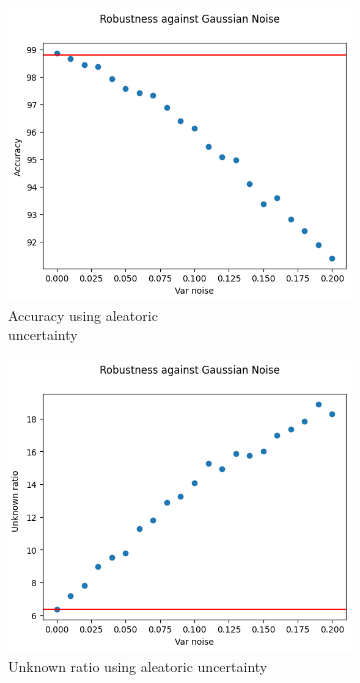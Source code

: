 \begin{figure}[h]
	\centering
	\begin{subfigure}{.33\textwidth}
		\centering
		\includegraphics[width=0.9\linewidth]{ImageFiles/EvalBNN/GN/AU/acc}
		\caption{Accuracy using aleatoric \\ uncertainty}
		\label{fig:gn_au_acc}
	\end{subfigure}%
	\begin{subfigure}{.33\textwidth}
		\centering
		\includegraphics[width=0.9\linewidth]{ImageFiles/EvalBNN/GN/AU/unkn}
		\caption{Unknown ratio using aleatoric uncertainty}
		\label{fig:gn_au_unkn}
	\end{subfigure}%
	\begin{subfigure}{.33\textwidth}

\end{subfigure}
\end{figure}
